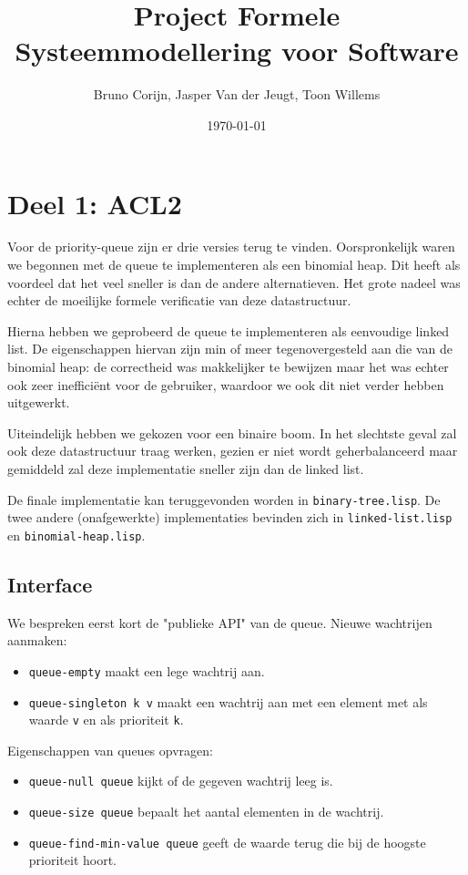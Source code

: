 \documentclass[a4paper,10pt]{article}
\title{Project Formele Systeemmodellering voor Software}
\author{Bruno Corijn, Jasper Van der Jeugt, Toon Willems}
\date{\today}
\begin{document}
\maketitle

\section{Deel 1: ACL2}

Voor de priority-queue zijn er drie versies terug te vinden. Oorspronkelijk
waren we begonnen met de queue te implementeren als een binomial heap. Dit heeft
als voordeel dat het veel sneller is dan de andere alternatieven. Het grote
nadeel was echter de moeilijke formele verificatie van deze datastructuur.

Hierna hebben we geprobeerd de queue te implementeren als eenvoudige linked
list. De eigenschappen hiervan zijn min of meer tegenovergesteld aan die van de
binomial heap: de correctheid was makkelijker te bewijzen maar het was echter
ook zeer ineffici\"ent voor de gebruiker, waardoor we ook dit niet verder hebben
uitgewerkt.

Uiteindelijk hebben we gekozen voor een binaire boom. In het slechtste geval zal
ook deze datastructuur traag werken, gezien er niet wordt geherbalanceerd maar
gemiddeld zal deze implementatie sneller zijn dan de linked list.

De finale implementatie kan teruggevonden worden in \texttt{binary-tree.lisp}.
De twee andere (onafgewerkte) implementaties bevinden zich in
\texttt{linked-list.lisp} en \texttt{binomial-heap.lisp}.

\subsection{Interface}

We bespreken eerst kort de "publieke API" van de queue. Nieuwe wachtrijen
aanmaken:

\begin{itemize}
    \item \texttt{queue-empty} maakt een lege wachtrij aan.
    \item \texttt{queue-singleton k v} maakt een wachtrij aan met een element
    met als waarde \texttt{v} en als prioriteit \texttt{k}.
\end{itemize}

Eigenschappen van queues opvragen:

\begin{itemize}
    \item \texttt{queue-null queue} kijkt of de gegeven wachtrij leeg is.
    \item \texttt{queue-size queue} bepaalt het aantal elementen in de wachtrij.
    \item \texttt{queue-find-min-value queue} geeft de waarde terug die bij de
    hoogste prioriteit hoort.
\end{itemize}
\end{document}
